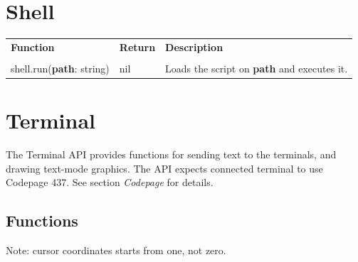 \documentclass[10pt, stock]{memoir}
\let\oldsection\section
\renewcommand\section{\clearpage\oldsection}
\begin{document}
\section{Shell}



\begin{tabularx}{\textwidth}{l l X}
	\textbf{\large Function} & \textbf{\large Return} & \textbf{\large Description}
	\\ \\
	\endhead
	shell.run(\textbf{path}: string) & nil & Loads the script on \textbf{path} and executes it.
\end{tabularx}

\section{Terminal}

The Terminal API provides functions for sending text to the terminals, and drawing text-mode graphics. The API expects connected terminal to use Codepage 437. See section \emph{Codepage} for details.

\subsection{Functions}

Note: cursor coordinates starts from one, not zero.
\end{document}
